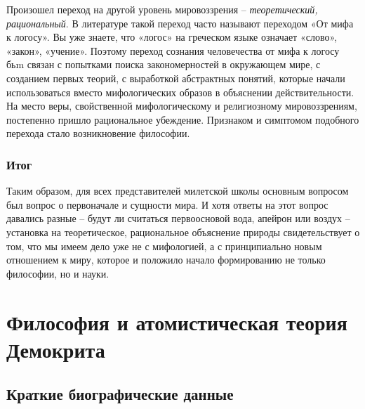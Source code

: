 \documentclass[
]{article}
\begin{document}
Произошел переход на другой уровень мировоззрения --
\emph{теоретический, рациональный}. В литературе такой переход часто
называют переходом «От мифа к логосу». Вы уже знаете, что «логос» на
греческом языке означает «слово», «закон», «учение». Поэтому переход
сознания человечества от мифа к логосу бьm связан с попытками поиска
закономерностей в окружающем мире, с созданием первых теорий, с
выработкой абстрактных понятий, которые начали использоваться вместо
мифологических образов в объяснении действительности. На место веры,
свойственной мифологическому и религиозному мировоззрениям, постепенно
пришло рациональное убеждение. Признаком и симптомом подобного перехода
стало возникновение философии.

\hypertarget{ux438ux442ux43eux433}{%
\subsubsection{Итог}\label{ux438ux442ux43eux433}}

Таким образом, для всех представителей милетской школы основным вопросом
был вопрос о первоначале и сущности мира. И хотя ответы на этот вопрос
давались разные -- будут ли считаться первоосновой вода, апейрон или
воздух -- установка на теоретическое, рациональное объяснение природы
свидетельствует о том, что мы имеем дело уже не с мифологией, а с
принципиально новым отношением к миру, которое и положило начало
формированию не только философии, но и науки.

\hypertarget{ux444ux438ux43bux43eux441ux43eux444ux438ux44f-ux438-ux430ux442ux43eux43cux438ux441ux442ux438ux447ux435ux441ux43aux430ux44f-ux442ux435ux43eux440ux438ux44f-ux434ux435ux43cux43eux43aux440ux438ux442ux430}{%
\section{Философия и атомистическая теория
Демокрита}\label{ux444ux438ux43bux43eux441ux43eux444ux438ux44f-ux438-ux430ux442ux43eux43cux438ux441ux442ux438ux447ux435ux441ux43aux430ux44f-ux442ux435ux43eux440ux438ux44f-ux434ux435ux43cux43eux43aux440ux438ux442ux430}}

\hypertarget{ux43aux440ux430ux442ux43aux438ux435-ux431ux438ux43eux433ux440ux430ux444ux438ux447ux435ux441ux43aux438ux435-ux434ux430ux43dux43dux44bux435}{%
\subsection{Краткие биографические
данные}\label{ux43aux440ux430ux442ux43aux438ux435-ux431ux438ux43eux433ux440ux430ux444ux438ux447ux435ux441ux43aux438ux435-ux434ux430ux43dux43dux44bux435}}
\end{document}
